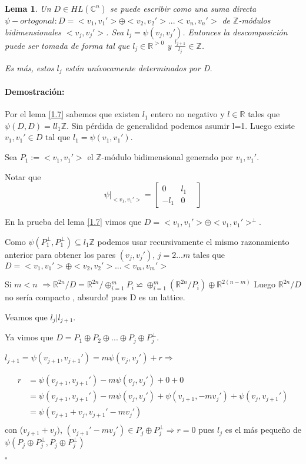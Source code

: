 \documentclass[12pt]{article}
\newtheorem{lemma}{Lema}
\newenvironment{proof}{\paragraph{Demostración:}}{\hfill$\square$}
\begin{document}
\begin{lemma} \label{1.8}
 Un $D \in HL(\mathbb{C}^n)$ se puede escribir como una suma directa $\psi-ortogonal : D=<v_1,v_1'>\oplus<v_2,v_2'>...<v_n,v_n'>$
 de $\mathbb{Z}$-módulos bidimensionales $<v_j,v_j'>$. Sea $l_j=\psi(v_j,v_j')$. Entonces la descomposición puede ser tomada 
 de forma tal que $l_j \in \mathbb{R}^{>0}$ y $\frac{l_{j+1}}{l_j}  \in \mathbb{Z}$.
 
 Es más, estos $l_j$ están unívocamente determinados por D.
\end{lemma}

\begin{proof}
Por el lema \ref{1.7} sabemos que existen $l_1$ entero no negativo y $l \in \mathbb{R}$ tales que  $\psi(D,D)  = l l_1 \mathbb{Z}$. Sin pérdida de generalidad podemos asumir l=1.
Luego existe $v_1,v_1' \in D$ tal que  $l_1=\psi(v_1,v_1')$.

Sea $P_1:=<v_1,v_1'>$ el $\mathbb{Z}$-módulo bidimensional generado por $v_1,v_1'$.

Notar que $$
\psi|_{<v_1,v_1'>} = \begin{bmatrix}
                              0 & l_1 &\\
                              -l_1 & 0 &
                             \end{bmatrix}
$$

En la prueba del lema \ref{1.7} vimos que $D=<v_1,v_1'> \oplus <v_1,v_1'>^\bot$.

Como $\psi(P_1^\bot,P_1^\bot) \subseteq l_1 \mathbb{Z}$ podemos usar recursivamente el mismo razonamiento anterior 
para obtener los pares $(v_j,v_j')$, $j=2...m$ tales que 
$D=<v_1,v_1'>\oplus<v_2,v_2'>...<v_m,v_m'>$

Si $m<n$ $\Rightarrow \mathbb{R}^{2n}/D=\mathbb{R}^{2n}/\oplus_{i=1}^m P_i \backsimeq \oplus_{i=1}^m (\mathbb{R}^{2n}/P_i) \oplus \mathbb{R}^{2(n-m)} $\newline
Luego $\mathbb{R}^{2n}/ D$ no sería compacto , absurdo! pues D es un lattice.
\newline


Veamos que $l_j|l_{j+1}$.

Ya vimos que $D= P_1\oplus P_2 \oplus...\oplus P_j \oplus P_j^\bot$.

$l_{j+1}=\psi(v_{j+1},v_{j+1}')=m \psi(v_j,v_j') +r \Rightarrow$ 

$$\begin{aligned}
r&=\psi(v_{j+1},v_{j+1}')-m \psi(v_j,v_j') + 0 + 0\\
&=\psi(v_{j+1},v_{j+1}')-m \psi(v_j,v_j') +  \psi(v_{j+1},-mv_j') + \psi(v_j,v_{j+1}')\\
&=\psi(v_{j+1} + v_j, v_{j+1}'-m v_j') \\
\end{aligned}$$ 
con ($v_{j+1} + v_j) $, $(v_{j+1}'-m v_j') \in P_j \oplus P_j^\bot \Rightarrow
r=0$ pues $l_j$ es el más pequeño de $\psi(P_j \oplus P_j^\bot, P_j \oplus P_j^\bot)$
\newline


\end{proof}
\end{document}

